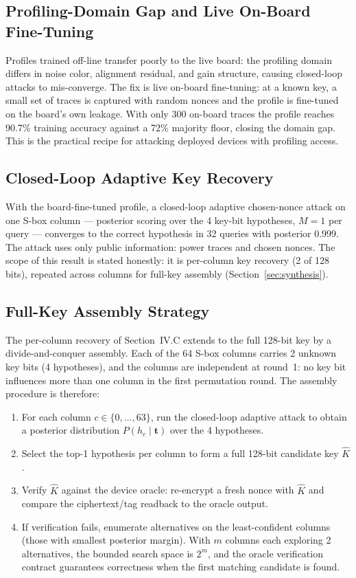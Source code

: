 \documentclass[conference]{IEEEtran}
\begin{document}
\subsection{Profiling-Domain Gap and Live On-Board Fine-Tuning}

Profiles trained off-line transfer poorly to the live board:
the profiling domain differs in noise color, alignment
residual, and gain structure, causing closed-loop attacks to
mis-converge. The fix is live on-board fine-tuning: at a known
key, a small set of traces is captured with random nonces and
the profile is fine-tuned on the board's own leakage. With only
300 on-board traces the profile reaches 90.7\% training
accuracy against a 72\% majority floor, closing the domain gap.
This is the practical recipe for attacking deployed devices with
profiling access.

\subsection{Closed-Loop Adaptive Key Recovery}

With the board-fine-tuned profile, a closed-loop adaptive
chosen-nonce attack on one S-box column — posterior scoring
over the 4 key-bit hypotheses, $M\!=\!1$ per query — converges
to the correct hypothesis in 32 queries with posterior 0.999.
The attack uses only public information: power traces and chosen
nonces. The scope of this result is stated honestly: it is
per-column key recovery (2 of 128 bits), repeated across
columns for full-key assembly (Section~\ref{sec:synthesis}).

\subsection{Full-Key Assembly Strategy}
\label{sec:assembly}

The per-column recovery of Section~IV.C extends to the full
128-bit key by a divide-and-conquer assembly. Each of the 64
S-box columns carries 2 unknown key bits (4 hypotheses), and the
columns are independent at round~1: no key bit influences more
than one column in the first permutation round. The assembly
procedure is therefore:

\begin{enumerate}
  \item For each column $c \in \{0, \ldots, 63\}$, run the
    closed-loop adaptive attack to obtain a posterior
    distribution $P(h_c \mid \mathbf{t})$ over the 4
    hypotheses.
  \item Select the top-1 hypothesis per column to form a full
    128-bit candidate key $\hat{K}$.
  \item Verify $\hat{K}$ against the device oracle: re-encrypt
    a fresh nonce with $\hat{K}$ and compare the ciphertext/tag
    readback to the oracle output.
  \item If verification fails, enumerate alternatives on the
    least-confident columns (those with smallest posterior
    margin). With $m$ columns each exploring 2 alternatives, the
    bounded search space is $2^m$, and the oracle verification
    contract guarantees correctness when the first matching
    candidate is found.
\end{enumerate}
\end{document}
